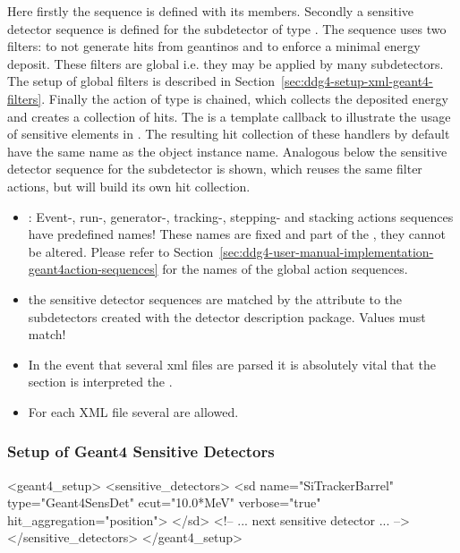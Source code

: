 \documentclass[10pt,a4paper]{article}
\begin{document}
Here firstly the  sequence is defined with its members. 
Secondly a sensitive detector sequence is defined for the subdetector
 of type .
The sequence uses two filters:  to not generate hits
from geantinos and  to enforce a minimal energy deposit.
These filters are global i.e. they may be applied by many subdetectors.
The setup of global filters is described in 
Section~\ref{sec:ddg4-setup-xml-geant4-filters}.
Finally the action  of type 
is chained, which collects the deposited energy and 
creates a collection of hits. The  is a template
callback to illustrate the usage of sensitive elements in \DDG.
The resulting hit collection of these handlers by default have the same name as the
object instance name.
Analogous below the sensitive detector sequence for the subdetector 
 is shown, which reuses the same filter actions, but will build its own
hit collection.

\noindent
{}
\begin{itemize}\itemcompact
\item {}: Event-, run-, generator-, tracking-,
    stepping- and stacking actions sequences have predefined names! 
    These names are fixed and part of the , they cannot be altered.
    Please refer to 
    Section~\ref{sec:ddg4-user-manual-implementation-geant4action-sequences} 
    for the names of the global action sequences.
\item the sensitive detector sequences are matched by the attribute  to the 
    subdetectors created with the \DDhep detector description package. Values must match!
\item In the event that several xml files are parsed it is absolutely vital that 
    the  section is interpreted  the .
\item For each XML file several  are allowed.
\noindent
\end{itemize}

\subsubsection{Setup of Geant4 Sensitive Detectors}
\label{sec:ddg4-setup-xml-geant4-sensitive detectors}
\begin{code}
  <geant4_setup>
    <sensitive_detectors>
      <sd name="SiTrackerBarrel" 
          type="Geant4SensDet" 
          ecut="10.0*MeV" 
          verbose="true" 
          hit_aggregation="position">
      </sd>
      <!-- ...  next sensitive detector ... -->
    </sensitive_detectors>
  </geant4_setup>
\end{code}
\end{document}
